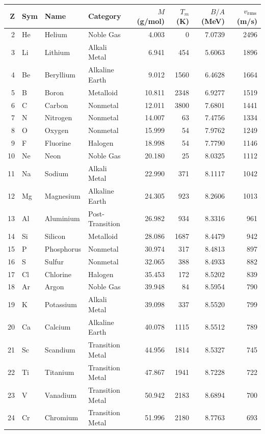 \documentclass[11pt,a4paper]{article}
\begin{document}
\begin{longtable}{rlllrrrr}
  \toprule
  Z & Sym & Name & Category & $M$ (g/mol) & $T_m$ (K) & $B/A$ (MeV) & $v_{\rm rms}$ (m/s)\\
  \midrule
  \endhead
  2 & He & Helium & Noble Gas & 4.003 & 0 & 7.0739 & 2496 \\
  3 & Li & Lithium & Alkali Metal & 6.941 & 454 & 5.6063 & 1896 \\
  4 & Be & Beryllium & Alkaline Earth & 9.012 & 1560 & 6.4628 & 1664 \\
  5 & B & Boron & Metalloid & 10.811 & 2348 & 6.9277 & 1519 \\
  6 & C & Carbon & Nonmetal & 12.011 & 3800 & 7.6801 & 1441 \\
  7 & N & Nitrogen & Nonmetal & 14.007 & 63 & 7.4756 & 1334 \\
  8 & O & Oxygen & Nonmetal & 15.999 & 54 & 7.9762 & 1249 \\
  9 & F & Fluorine & Halogen & 18.998 & 54 & 7.7790 & 1146 \\
  10 & Ne & Neon & Noble Gas & 20.180 & 25 & 8.0325 & 1112 \\
  11 & Na & Sodium & Alkali Metal & 22.990 & 371 & 8.1117 & 1042 \\
  12 & Mg & Magnesium & Alkaline Earth & 24.305 & 923 & 8.2606 & 1013 \\
  13 & Al & Aluminium & Post-Transition & 26.982 & 934 & 8.3316 & 961 \\
  14 & Si & Silicon & Metalloid & 28.086 & 1687 & 8.4479 & 942 \\
  15 & P & Phosphorus & Nonmetal & 30.974 & 317 & 8.4813 & 897 \\
  16 & S & Sulfur & Nonmetal & 32.065 & 388 & 8.4933 & 882 \\
  17 & Cl & Chlorine & Halogen & 35.453 & 172 & 8.5202 & 839 \\
  18 & Ar & Argon & Noble Gas & 39.948 & 84 & 8.5954 & 790 \\
  19 & K & Potassium & Alkali Metal & 39.098 & 337 & 8.5520 & 799 \\
  20 & Ca & Calcium & Alkaline Earth & 40.078 & 1115 & 8.5512 & 789 \\
  21 & Sc & Scandium & Transition Metal & 44.956 & 1814 & 8.5327 & 745 \\
  22 & Ti & Titanium & Transition Metal & 47.867 & 1941 & 8.7228 & 722 \\
  23 & V & Vanadium & Transition Metal & 50.942 & 2183 & 8.6894 & 700 \\
  24 & Cr & Chromium & Transition Metal & 51.996 & 2180 & 8.7763 & 693 \\

\end{longtable}
\end{document}
